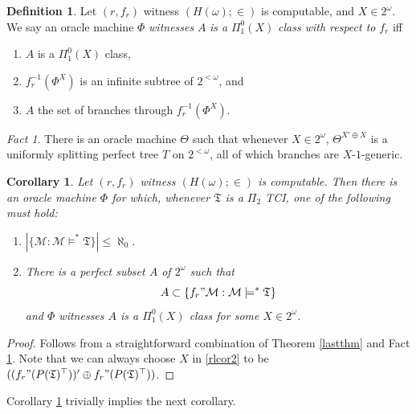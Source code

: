 \documentclass[12pt, twoside]{memoir}
\numberwithin{equation}{section}
\newtheorem{cor}[thm]{Corollary}
\theoremstyle{definition}
\newtheorem{defi}[thm]{Definition}
\theoremstyle{remark}
\newtheorem{fact}[thm]{Fact}
\theoremstyle{definition}
\theoremstyle{definition}
\theoremstyle{definition}
\theoremstyle{remark}
\begin{document}
\begin{defi}
Let $(r, f_r)$ witness $(H(\omega); \in)$ is computable, and $X \in 2^{\omega}$. We say an oracle machine $\Phi$ \emph{witnesses} $A$ \emph{is a} $\Pi^0_1(X)$ \emph{class with respect to} $f_r$ iff 
\begin{enumerate}[label=(\arabic*)]
    \item $A$ is a $\Pi^0_1(X)$ class, 
    \item $f_r^{-1}(\Phi^X)$ is an infinite subtree of $2^{<\omega}$, and
    \item $A$ the set of branches through $f_r^{-1}(\Phi^X)$.
\end{enumerate} 
\end{defi}

\begin{fact}\label{2ndlf}
There is an oracle machine $\Theta$ such that whenever $X \in 2^{\omega}$, $\Theta^{X' \oplus X}$ is a uniformly splitting perfect tree $T$ on $2^{<\omega}$, all of which branches are $X$-$1$-generic.
\end{fact}

\begin{cor}\label{rlcor}
Let $(r, f_r)$ witness $(H(\omega); \in)$ is computable. Then there is an oracle machine $\Phi$ for which, whenever $\mathfrak{T}$ is a $\Pi_2$ TCI, one of the following must hold:
\begin{enumerate}[label=(\arabic*)]
    \item $|\{\mathcal{M} : \mathcal{M} \models^* \mathfrak{T}\}| \leq \aleph_0$.
    \item\label{rlcor2} There is a perfect subset $A$ of $2^{\omega}$ such that $$A \subset \{f_r" \mathcal{M} : \mathcal{M} \models^* \mathfrak{T}\}$$ and $\Phi$ witnesses $A$ is a $\Pi^0_1(X)$ class for some $X \in 2^{\omega}$.
\end{enumerate}
\end{cor}

\begin{proof}
Follows from a straightforward combination of Theorem \ref{lastthm} and Fact \ref{2ndlf}. Note that we can always choose $X$ in \ref{rlcor2} to be $((f_r" (P(\mathfrak{T})^{\top}))' \oplus f_r" (P(\mathfrak{T})^{\top}))$.
\end{proof}

Corollary \ref{rlcor} trivially implies the next corollary.
\end{document}
